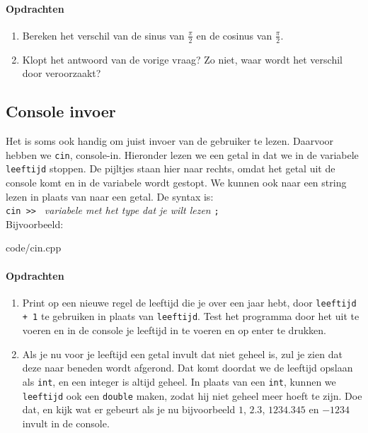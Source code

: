\documentclass[12pt,a4paper]{article}
\newcommand{\code}{}
\newcommand{\icode}{\lstinline}
\begin{document}
\paragraph{Opdrachten} 
\begin{enumerate}
\item 
Bereken het verschil van de sinus van $\frac{\pi}{2}$ en de cosinus van $\frac{\pi}{2}$.
\item
Klopt het antwoord van de vorige vraag? Zo niet, waar wordt het verschil door veroorzaakt? 
\end{enumerate} 
\subsection{Console invoer}
Het is soms ook handig om juist invoer van de gebruiker te lezen. Daarvoor hebben we \icode{cin}, console-in. Hieronder lezen we een getal in dat we in de variabele \icode{leeftijd} stoppen. De pijltjes staan hier naar rechts, omdat het getal uit de console komt en in de variabele wordt gestopt. We kunnen ook naar een string lezen in plaats van naar een getal. De syntax is: \\

\icode{cin >> } \emph{variabele met het type dat je wilt lezen} \icode{;}\\

Bijvoorbeeld:

\code{code/cin.cpp}
\paragraph{Opdrachten}
\begin{enumerate}
	\item Print op een nieuwe regel de leeftijd die je over een jaar hebt, door \icode{leeftijd + 1} te gebruiken in plaats van \icode{leeftijd}.
		Test het programma door het uit te voeren en in de console je leeftijd in te voeren en op enter te drukken.
	\item
		Als je nu voor je leeftijd een getal invult dat niet geheel is, zul je zien dat deze naar beneden wordt afgerond. Dat komt doordat we de leeftijd opslaan als \icode{int}, en een integer is altijd geheel.
		In plaats van een \icode{int}, kunnen we \icode{leeftijd} ook een \icode{double} maken, zodat hij niet geheel meer hoeft te zijn. Doe dat, en kijk wat er gebeurt als je nu bijvoorbeeld $1$, $2.3$, $1234.345$ en $-1234$ invult in de console.
\end{enumerate}
\end{document}
